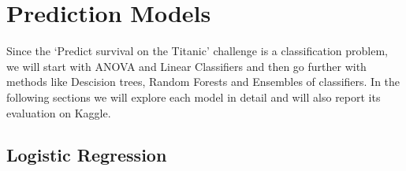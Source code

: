 \documentclass[a4paper,10pt]{report}
\begin{document}
\chapter{Prediction Models}
Since the `Predict survival on the Titanic' challenge is a classification problem, we will start with ANOVA and Linear Classifiers and then go further with methods like Descision trees, Random Forests and Ensembles of classifiers. In the following sections we will explore each model in detail and will also report its evaluation on Kaggle.

\section{Logistic Regression}
\end{document}
